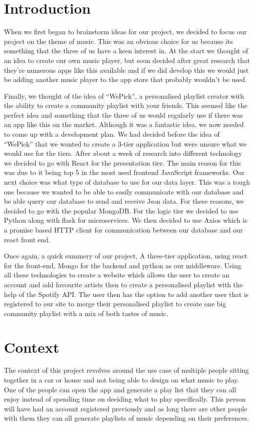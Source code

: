 \chapter{Introduction}
When we first began to brainstorm ideas for our project, we decided to focus our project on the theme of music. This was an obvious choice for us because its something that the three of us have a keen interest in. At the start we thought of an idea to create our own music player, but soon decided after great research that they’re numerous apps like this available and if we did develop this we would just be adding another music player to the app store that probably wouldn’t be used. 
\par
Finally, we thought of the idea of “WePick”, a personalised playlist creator with the ability to create a community playlist with your friends. This seemed like the perfect idea and something that the three of us would regularly use if there was an app like this on the market. Although it was a fantastic idea, we now needed to come up with a development plan. We had decided before the idea of “WePick” that we wanted to create a 3-tier application but were unsure what we would use for the tiers. After about a week of research into different technology we decided to go with React for the presentation tier. The main reason for this was due to it being top 5 in the most used frontend JavaScript frameworks. Our next choice was what type of database to use for our data layer. This was a tough one because we wanted to be able to easily communicate with our database and be able query our database to send and receive Json data. For these reasons, we decided to go with the popular MongoDB. For the logic tier we decided to use Python along with flask for microservices. We then decided to use Axios which is a promise based HTTP client for communication between our database and our react front end.
\par
Once again, a quick summery of our project, A three-tier application, using react for the front-end, Mongo for the backend and python as our middleware. Using all these technologies to create a website which allows the user to create an account and add favourite artists then to create a personalised playlist with the help of the Spotify API. The user then has the option to add another user that is registered to our site to merge their personalised playlist to create one big community playlist with a mix of both tastes of music.



\chapter{Context}
The context of this project revolves around the use case of multiple people sitting together in a car or house and not being able to design on what music to play. One of the people can open the app and generate a play list that they can all enjoy instead of spending time on deciding what to play specifically.
This person will have had an account registered previously and as long there are other people with them they can all generate playlists of music depending on their preferences.\newline

